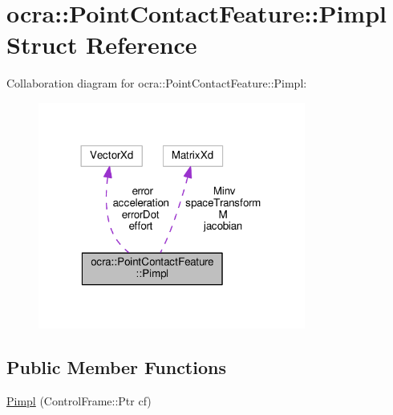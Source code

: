 \hypertarget{structocra_1_1PointContactFeature_1_1Pimpl}{}\section{ocra\+:\+:Point\+Contact\+Feature\+:\+:Pimpl Struct Reference}
\label{structocra_1_1PointContactFeature_1_1Pimpl}


Collaboration diagram for ocra\+:\+:Point\+Contact\+Feature\+:\+:Pimpl\+:
\nopagebreak
\begin{figure}[H]
\begin{center}
\leavevmode
\includegraphics[width=249pt]{d0/dfa/structocra_1_1PointContactFeature_1_1Pimpl__coll__graph}
\end{center}
\end{figure}
\subsection*{Public Member Functions}
\begin{DoxyCompactItemize}
\item 
\hyperlink{structocra_1_1PointContactFeature_1_1Pimpl_aee2b366b499152deb1659571bb621ac8}{Pimpl} (Control\+Frame\+::\+Ptr cf)
\end{DoxyCompactItemize}
